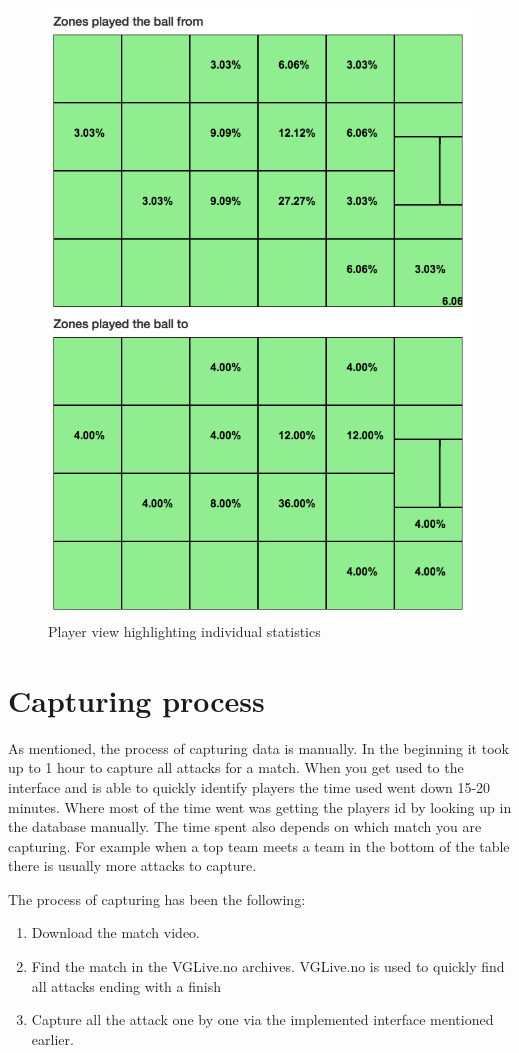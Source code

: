 \begin{figure}[ht!]
\centering
\includegraphics[width=1\textwidth]{images/general/player_view2.png}
\caption{Player view highlighting individual statistics}
\label{fig:player_view2}
\end{figure}


\section{Capturing process}
\label{sec:capprocess}

As mentioned, the process of capturing data is manually. In the beginning it took up to 1 hour to capture all attacks for a match. When you get used to the interface and is able to quickly identify players the time used went down 15-20 minutes. Where most of the time went was getting the players id by looking up in the database manually. The time spent also depends on which match you are capturing. For example when a top team meets a team in the bottom of the table there is usually more attacks to capture. 

The process of capturing has been the following:
\begin{enumerate}
\item Download the match video.
\item Find the match in the VGLive.no archives. VGLive.no is used to quickly find all attacks ending with a finish
\item Capture all the attack one by one via the implemented interface mentioned earlier.
\end{enumerate}

